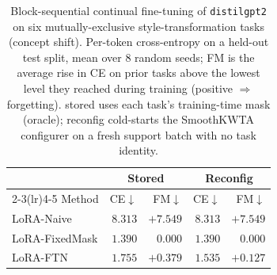 \begin{table}[t]
\caption{Block-sequential continual fine-tuning of {\tt distilgpt2} on six mutually-exclusive style-transformation tasks (concept shift). Per-token cross-entropy on a held-out test split, mean over 8 random seeds; FM is the average rise in CE on prior tasks above the lowest level they reached during training (positive $\Rightarrow$ forgetting). {\sc stored} uses each task's training-time mask (oracle); {\sc reconfig} cold-starts the SmoothKWTA configurer on a fresh support batch with no task identity.}
\label{tab:lora_styles}
\vskip 0.05in
\begin{center}\begin{small}\begin{sc}
\begin{tabular}{lrrrr}
\toprule
 & \multicolumn{2}{c}{Stored} & \multicolumn{2}{c}{Reconfig} \\
\cmidrule(lr){2-3}\cmidrule(lr){4-5}
Method & CE$\downarrow$ & FM$\downarrow$ & CE$\downarrow$ & FM$\downarrow$ \\
\midrule
LoRA-Naive & $8.313$ & $+7.549$ & $8.313$ & $+7.549$ \\
LoRA-FixedMask & $1.390$ & $0.000$ & $1.390$ & $0.000$ \\
LoRA-FTN & $1.755$ & $+0.379$ & $1.535$ & $+0.127$ \\
\bottomrule
\end{tabular}
\end{sc}\end{small}\end{center}
\vskip -0.1in
\end{table}
